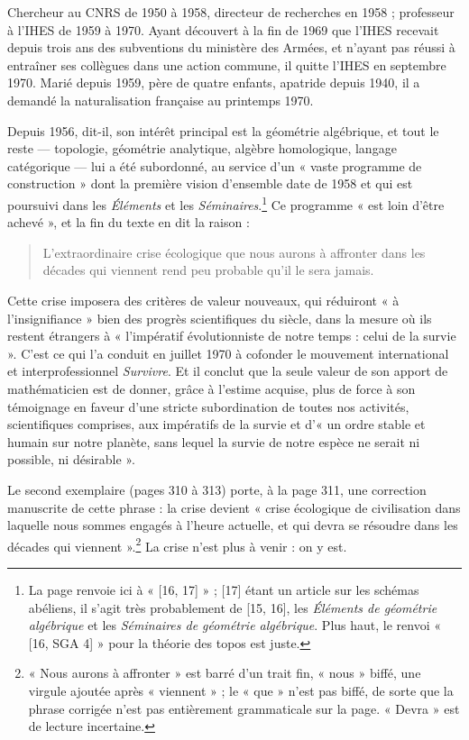 \documentclass[11pt,a4paper]{article}
\begin{document}
Chercheur au CNRS de 1950 à 1958, directeur de recherches en 1958 ;
professeur à l'IHES de 1959 à 1970. Ayant découvert à la fin de 1969 que
l'IHES recevait depuis trois ans des subventions du ministère des Armées, et
n'ayant pas réussi à entraîner ses collègues dans une action commune, il
quitte l'IHES en septembre 1970. Marié depuis 1959, père de quatre enfants,
apatride depuis 1940, il a demandé la naturalisation française au printemps
1970.

Depuis 1956, dit-il, son intérêt principal est la géométrie algébrique, et
tout le reste — topologie, géométrie analytique, algèbre homologique,
langage catégorique — lui a été subordonné, au service d'un « vaste programme
de construction » dont la première vision d'ensemble date de 1958 et qui est
poursuivi dans les \emph{Éléments} et les \emph{Séminaires}.\footnote{La page
renvoie ici à « [16, 17] » ; [17] étant un article sur les schémas abéliens,
il s'agit très probablement de [15, 16], les \emph{Éléments de géométrie
algébrique} et les \emph{Séminaires de géométrie algébrique}. Plus haut, le
renvoi « [16, SGA 4] » pour la théorie des topos est juste.} Ce programme
« est loin d'être achevé », et la fin du texte en dit la raison :

\begin{quote}
L'extraordinaire crise écologique que nous aurons à affronter dans les
décades qui viennent rend peu probable qu'il le sera jamais.
\end{quote}

Cette crise imposera des critères de valeur nouveaux, qui réduiront « à
l'insignifiance » bien des progrès scientifiques du siècle, dans la mesure où
ils restent étrangers à « l'impératif évolutionniste de notre temps : celui
de la survie ». C'est ce qui l'a conduit en juillet 1970 à cofonder le
mouvement international et interprofessionnel \emph{Survivre}. Et il
conclut que la seule valeur de son apport de mathématicien est de donner,
grâce à l'estime acquise, plus de force à son témoignage en faveur d'une
stricte subordination de toutes nos activités, scientifiques comprises, aux
impératifs de la survie et d'« un ordre stable et humain sur notre planète,
sans lequel la survie de notre espèce ne serait ni possible, ni désirable ».

Le second exemplaire (pages 310 à 313) porte, à la page 311, une correction
manuscrite de cette phrase : la crise devient « crise écologique de
civilisation dans laquelle nous sommes engagés à l'heure actuelle, et qui
devra se résoudre dans les décades qui viennent ».\footnote{« Nous aurons à
affronter » est barré d'un trait fin, « nous » biffé, une virgule ajoutée
après « viennent » ; le « que » n'est pas biffé, de sorte que la phrase
corrigée n'est pas entièrement grammaticale sur la page. « Devra » est de
lecture incertaine.} La crise n'est plus à venir : on y est.
\end{document}
